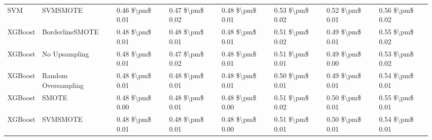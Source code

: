 \begin{tabular}{llllllll}
                            SVM &                      SVMSMOTE & 0.46 \$\textbackslash pm\$ 0.01 &           0.47 \$\textbackslash pm\$ 0.02 &       0.48 \$\textbackslash pm\$ 0.01 &        0.53 \$\textbackslash pm\$ 0.02 &                         0.52 \$\textbackslash pm\$ 0.01 &     0.56 \$\textbackslash pm\$ 0.02 \\
                        XGBoost &               BorderlineSMOTE & 0.48 \$\textbackslash pm\$ 0.01 &           0.48 \$\textbackslash pm\$ 0.01 &       0.48 \$\textbackslash pm\$ 0.01 &        0.51 \$\textbackslash pm\$ 0.02 &                         0.49 \$\textbackslash pm\$ 0.01 &     0.55 \$\textbackslash pm\$ 0.02 \\
                        XGBoost &                 No Upsampling & 0.48 \$\textbackslash pm\$ 0.01 &           0.47 \$\textbackslash pm\$ 0.02 &       0.48 \$\textbackslash pm\$ 0.01 &        0.51 \$\textbackslash pm\$ 0.01 &                         0.49 \$\textbackslash pm\$ 0.00 &     0.53 \$\textbackslash pm\$ 0.02 \\
                        XGBoost &           Random Oversampling & 0.48 \$\textbackslash pm\$ 0.01 &           0.48 \$\textbackslash pm\$ 0.01 &       0.48 \$\textbackslash pm\$ 0.01 &        0.50 \$\textbackslash pm\$ 0.01 &                         0.49 \$\textbackslash pm\$ 0.01 &     0.54 \$\textbackslash pm\$ 0.01 \\
                        XGBoost &                         SMOTE & 0.48 \$\textbackslash pm\$ 0.00 &           0.48 \$\textbackslash pm\$ 0.01 &       0.48 \$\textbackslash pm\$ 0.00 &        0.51 \$\textbackslash pm\$ 0.02 &                         0.50 \$\textbackslash pm\$ 0.01 &     0.55 \$\textbackslash pm\$ 0.01 \\
                        XGBoost &                      SVMSMOTE & 0.48 \$\textbackslash pm\$ 0.01 &           0.48 \$\textbackslash pm\$ 0.01 &       0.48 \$\textbackslash pm\$ 0.00 &        0.51 \$\textbackslash pm\$ 0.01 &                         0.50 \$\textbackslash pm\$ 0.01 &     0.54 \$\textbackslash pm\$ 0.01 \\
\bottomrule
\end{tabular}
